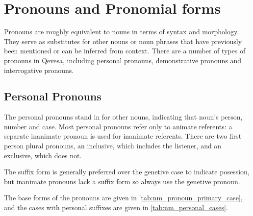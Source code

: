 \documentclass[grammar]{subfiles}
\begin{document}
\section{Pronouns and Pronomial forms}
\label{sec:nm_pronouns}

Pronouns are roughly equivalent to nouns in terms of syntax and morphology.
They serve as substitutes for other nouns or noun phrases that have
previously been mentioned or can be inferred from context.  There are a
number of types of pronouns in Qevesa, including personal pronouns,
demonstrative pronouns and interrogative pronouns.


\subsection{Personal Pronouns}
\label{ssec:nm_personal_pronouns}

The personal pronouns stand in for other nouns, indicating that noun's
person, number and case.  Most personal pronouns refer only to animate
referents: a separate inanimate pronoun is used for inanimate referents.
There are two first person plural pronouns, an inclusive, which includes the
listener, and an exclusive, which does not. 

The suffix form is generally preferred over the genetive case to indicate
posession, but inanimate pronouns lack a suffix form so always use the
genetive pronoun. 

The base forms of the pronouns are given in
\cref{tab:nm_pronoun_primary_case}, and the cases with personal suffixes
are given in \cref{tab:nm_personal_cases}.
\end{document}
